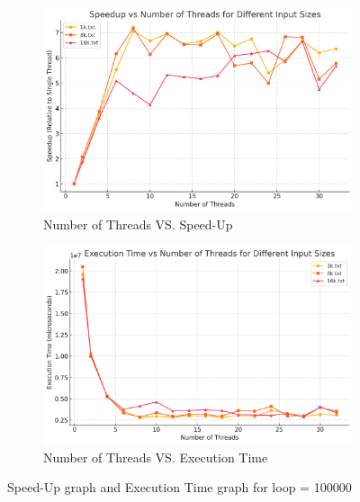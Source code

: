 \documentclass[letterpaper,12pt]{article}
\theoremstyle{remark}
\begin{document}
\begin{figure}[H]
    \centering
    \begin{subfigure}[t]{0.48\textwidth}  %
        \centering
        \includegraphics[width=\textwidth]{codioWithSleepLoop100000.png}
        \caption{Number of Threads VS. Speed-Up}
        \label{fig:ThreadVsSpeedUp1}
    \end{subfigure}
    \hfill  %
    \begin{subfigure}[t]{0.48\textwidth}  %
        \centering
        \includegraphics[width=\textwidth]{codioExecutionTimeLoop100000.png}
        \caption{Number of Threads VS. Execution Time}
        \label{fig:ThreadVsExecutionTime}
    \end{subfigure}
    \caption{Speed-Up graph and Execution Time graph for loop = 100000}
    \label{fig:ThreadVsComparison}
\end{figure}
\hfill  %
\end{document}
